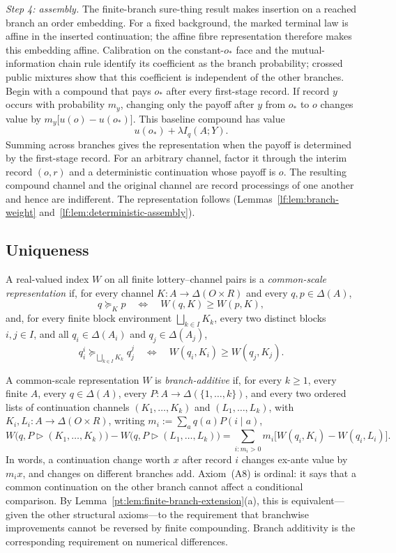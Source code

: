 \documentclass[11pt,a4paper]{article}
\theoremstyle{definition}
\newcommand{\D}{\Delta}
\newcommand{\I}{I}
\newcommand{\1}{\mathbf 1}
\begin{document}
\emph{Step 4: assembly.}  The finite-branch sure-thing result makes insertion on a reached branch an order
embedding.  For a fixed background, the marked terminal law is affine in the inserted continuation; the affine
fibre representation therefore makes this embedding affine.
Calibration on the constant-$o_\ast$ face and the mutual-information chain rule identify its coefficient as the
branch probability; crossed public mixtures show that this coefficient is independent of the other branches.
Begin with a compound that pays $o_\ast$
after every first-stage record.  If record $y$ occurs with probability $m_y$, changing only the payoff after $y$
from $o_\ast$ to $o$ changes value by
$
 m_y\bigl[u(o)-u(o_\ast)\bigr].
$
This baseline compound has value
\[
 u(o_\ast)+\lambda\I_q(A;Y).
\]
Summing across branches gives the representation when the payoff is determined by the first-stage record.  For
an arbitrary channel, factor it through the interim record $(o,r)$ and a deterministic continuation whose payoff
is $o$.  The resulting compound channel and
the original channel are record processings of one another and hence are indifferent.  The representation
follows (Lemmas~\ref{lf:lem:branch-weight} and~\ref{lf:lem:deterministic-assembly}).

\subsection{Uniqueness}

A real-valued index $W$ on all finite lottery--channel pairs is a \emph{common-scale representation} if, for every channel
$K:A\to\D(O\times R)$ and every $q,p\in\D(A)$,
\[
 q\succeq_Kp
 \quad\Longleftrightarrow\quad
 W(q,K)\ge W(p,K),
\]
and, for every finite block environment $\bigsqcup_{k\in I}K_k$, every two distinct blocks $i,j\in I$, and all
$q_i\in\D(A_i)$ and $q_j\in\D(A_j)$,
\[
 q_i^i\succeq_{\bigsqcup_{k\in I}K_k}q_j^j
 \quad\Longleftrightarrow\quad
 W(q_i,K_i)\ge W(q_j,K_j).
\]

A common-scale representation $W$
is \emph{branch-additive} if, for every $k\ge1$, every finite $A$, every $q\in\D(A)$, every $P:A\to\D(\{1,\ldots,k\})$, and every
two ordered lists of continuation channels $(K_1,\ldots,K_k)$ and $(L_1,\ldots,L_k)$, with
$K_i,L_i:A\to\D(O\times R)$, writing
$m_i:=\sum_aq(a)P(i\mid a)$,
\begin{equation}
 W\bigl(q,P\triangleright(K_1,\ldots,K_k)\bigr)
 -W\bigl(q,P\triangleright(L_1,\ldots,L_k)\bigr)
 =\sum_{i:m_i>0}m_i
 \bigl[W(q_i,K_i)-W(q_i,L_i)\bigr].
 \label{eq:branch-additive-index}
\end{equation}
In words, a continuation change worth $x$ after record $i$ changes ex-ante value by $m_i x$, and changes on
different branches add. Axiom~\textup{(A8)} is ordinal: it says that a common continuation on the other branch cannot affect a conditional
comparison.  By Lemma~\ref{pt:lem:finite-branch-extension}\textup{(a)}, this is equivalent---given the other structural
axioms---to the requirement that branchwise improvements cannot be reversed by finite compounding.  Branch
additivity is the corresponding requirement on numerical differences.  
\end{document}
